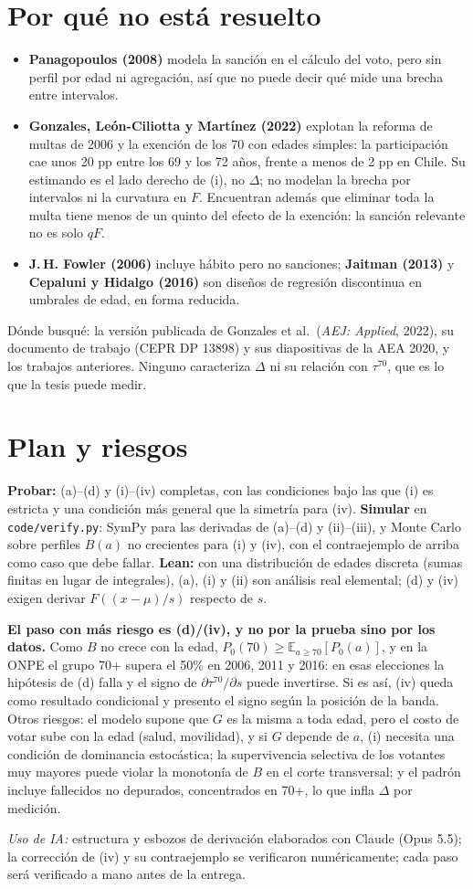 \documentclass[11pt]{article}
\begin{document}
\section{Por qué no está resuelto}
\begin{itemize}
\item \textbf{Panagopoulos (2008)} modela la sanción en el cálculo del voto, pero sin perfil por edad ni agregación, así que no puede decir qué mide una brecha entre intervalos.
\item \textbf{Gonzales, León-Ciliotta y Martínez (2022)} explotan la reforma de multas de 2006 y la exención de los 70 con edades simples: la participación cae unos 20 pp entre los 69 y los 72 años, frente a menos de 2 pp en Chile. Su estimando es el lado derecho de (i), no $\Delta$; no modelan la brecha por intervalos ni la curvatura en $F$. Encuentran además que eliminar toda la multa tiene menos de un quinto del efecto de la exención: la sanción relevante no es solo $qF$.
\item \textbf{J.\,H. Fowler (2006)} incluye hábito pero no sanciones; \textbf{Jaitman (2013)} y \textbf{Cepaluni y Hidalgo (2016)} son diseños de regresión discontinua en umbrales de edad, en forma reducida.
\end{itemize}
Dónde busqué: la versión publicada de Gonzales et al.\ (\emph{AEJ: Applied}, 2022), su documento de trabajo (CEPR DP 13898) y sus diapositivas de la AEA 2020, y los trabajos anteriores. Ninguno caracteriza $\Delta$ ni su relación con $\tau^{70}$, que es lo que la tesis puede medir.

\section{Plan y riesgos}
\textbf{Probar:} (a)--(d) y (i)--(iv) completas, con las condiciones bajo las que (i) es estricta y una condición más general que la simetría para (iv). \textbf{Simular} en \texttt{code/verify.py}: SymPy para las derivadas de (a)--(d) y (ii)--(iii), y Monte Carlo sobre perfiles $B(a)$ no crecientes para (i) y (iv), con el contraejemplo de arriba como caso que debe fallar. \textbf{Lean:} con una distribución de edades discreta (sumas finitas en lugar de integrales), (a), (i) y (ii) son análisis real elemental; (d) y (iv) exigen derivar $F((x-\mu)/s)$ respecto de $s$.

\textbf{El paso con más riesgo es (d)/(iv), y no por la prueba sino por los datos.} Como $B$ no crece con la edad, $P_0(70)\ge\mathbb E_{a\ge70}[P_0(a)]$, y en la ONPE el grupo 70+ supera el 50\% en 2006, 2011 y 2016: en esas elecciones la hipótesis de (d) falla y el signo de $\partial\tau^{70}/\partial s$ puede invertirse. Si es así, (iv) queda como resultado condicional y presento el signo según la posición de la banda. Otros riesgos: el modelo supone que $G$ es la misma a toda edad, pero el costo de votar sube con la edad (salud, movilidad), y si $G$ depende de $a$, (i) necesita una condición de dominancia estocástica; la supervivencia selectiva de los votantes muy mayores puede violar la monotonía de $B$ en el corte transversal; y el padrón incluye fallecidos no depurados, concentrados en 70+, lo que infla $\Delta$ por medición.

\vspace{2pt}
{\footnotesize\textit{Uso de IA:} estructura y esbozos de derivación elaborados con Claude (Opus 5.5); la corrección de (iv) y su contraejemplo se verificaron numéricamente; cada paso será verificado a mano antes de la entrega.}
\end{document}
